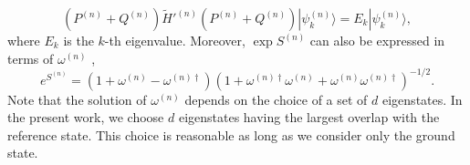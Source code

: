 \documentclass[aps,prc, dvips, twocolumn,groupedaddress,showkeys,showpacs,floatfix,superscriptaddress]{revtex4-1}
\newcommand{\<}{\langle}
\renewcommand{\>}{\rangle}
\begin{document}
\begin{equation}
 \label{shc_n}
 (P^{(n)}+Q^{(n)})\widetilde{H}'^{(n)}(P^{(n)}+Q^{(n)})|\psi^{(n)}_{k}\>
 = E_{k}|\psi^{(n)}_{k}\>,
\end{equation}
where $E_{k}$ is the $k$-th eigenvalue.
Moreover, $\exp S^{(n)}$ can also be expressed in terms of $\omega^{(n)}$ \cite{Suzuki:1994},
\begin{equation}
 \label{exp_omega}
  e^{S^{(n)}} =
  (1+\omega^{(n)}-\omega^{(n)\dag})(1+\omega^{(n)\dag}\omega^{(n)} +
  \omega^{(n)}\omega^{(n)\dag})^{-1/2}.
\end{equation}
Note that the solution of $\omega^{(n)}$ depends on the choice of a set of
$d$ eigenstates. In the present work, we choose $d$ eigenstates having the
largest overlap with the reference state.
This choice is reasonable as long as we consider only the ground state.
\end{document}
